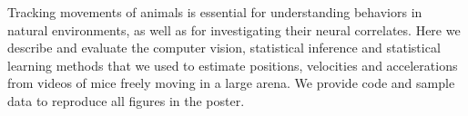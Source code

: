 Tracking movements of animals is essential for understanding behaviors in
natural environments, as well as for investigating their neural correlates.
%
Here we describe and evaluate the computer vision, statistical inference and
statistical learning methods that we used to estimate positions, velocities and
accelerations from videos of mice freely moving in a large arena.
%
We provide code and sample data to reproduce all figures in the poster.
